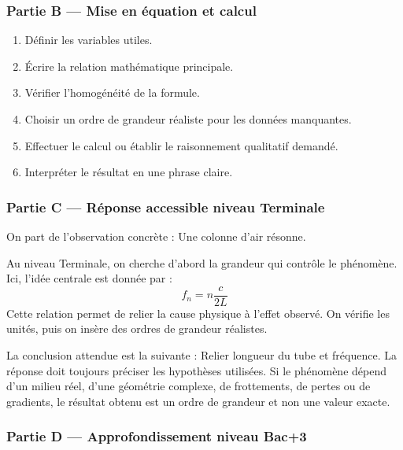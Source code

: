 \documentclass[11pt,a4paper]{article}
\begin{document}
\subsubsection*{Partie B — Mise en équation et calcul}

\begin{enumerate}
  \item Définir les variables utiles.
  \item Écrire la relation mathématique principale.
  \item Vérifier l'homogénéité de la formule.
  \item Choisir un ordre de grandeur réaliste pour les données manquantes.
  \item Effectuer le calcul ou établir le raisonnement qualitatif demandé.
  \item Interpréter le résultat en une phrase claire.
\end{enumerate}

\subsubsection*{Partie C — Réponse accessible niveau Terminale}

\begin{corrigebox}
On part de l'observation concrète : Une colonne d'air résonne.

Au niveau Terminale, on cherche d'abord la grandeur qui contrôle le phénomène. Ici, l'idée centrale est donnée par :
\[
f_n=n\frac{c}{2L}
\]
Cette relation permet de relier la cause physique à l'effet observé. On vérifie les unités, puis on insère des ordres de grandeur réalistes.

La conclusion attendue est la suivante : Relier longueur du tube et fréquence. La réponse doit toujours préciser les hypothèses utilisées. Si le phénomène dépend d'un milieu réel, d'une géométrie complexe, de frottements, de pertes ou de gradients, le résultat obtenu est un ordre de grandeur et non une valeur exacte.
\end{corrigebox}

\subsubsection*{Partie D — Approfondissement niveau Bac+3}
\end{document}
